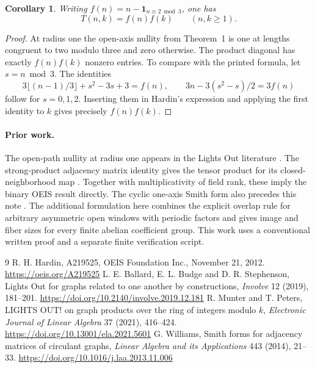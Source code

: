 \documentclass[11pt]{article}
\newtheorem{corollary}[theorem]{Corollary}
\begin{document}
\begin{corollary}
Writing $f(n)=n-\mathbf1_{n\equiv2\bmod3}$, one has
\[
                   T(n,k)=f(n)f(k)\qquad (n,k\ge1).
\]
\end{corollary}
\begin{proof}
At radius one the open-axis nullity from Theorem~1 is one at lengths congruent to two modulo three and zero otherwise. The product diagonal has exactly $f(n)f(k)$ nonzero entries. To compare with the printed formula, let $s=n\bmod3$. The identities
\[
 3\lfloor(n-1)/3\rfloor+s^2-3s+3=f(n),\qquad
 3n-3(s^2-s)/2=3f(n)
\]
follow for $s=0,1,2$. Inserting them in Hardin's expression and applying the first identity to $k$ gives precisely $f(n)f(k)$.
\end{proof}

\paragraph{Prior work.}
The open-path nullity at radius one appears in the Lights Out literature \cite{ballard}. The strong-product adjacency matrix identity gives the tensor product for its closed-neighborhood map \cite{munter}. Together with multiplicativity of field rank, these imply the binary OEIS result directly. The cyclic one-axis Smith form also precedes this note \cite{williams}. The additional formulation here combines the explicit overlap rule for arbitrary asymmetric open windows with periodic factors and gives image and fiber sizes for every finite abelian coefficient group. This work uses a conventional written proof and a separate finite verification script.

\begin{thebibliography}{9}
 R. H. Hardin, A219525, OEIS Foundation Inc., November 21, 2012. \url{https://oeis.org/A219525}
 L. E. Ballard, E. L. Budge and D. R. Stephenson, Lights Out for graphs related to one another by constructions, \emph{Involve} 12 (2019), 181--201. \url{https://doi.org/10.2140/involve.2019.12.181}
 R. Munter and T. Peters, LIGHTS OUT! on graph products over the ring of integers modulo $k$, \emph{Electronic Journal of Linear Algebra} 37 (2021), 416--424. \url{https://doi.org/10.13001/ela.2021.5601}
 G. Williams, Smith forms for adjacency matrices of circulant graphs, \emph{Linear Algebra and its Applications} 443 (2014), 21--33. \url{https://doi.org/10.1016/j.laa.2013.11.006}
\end{thebibliography}
\end{document}
